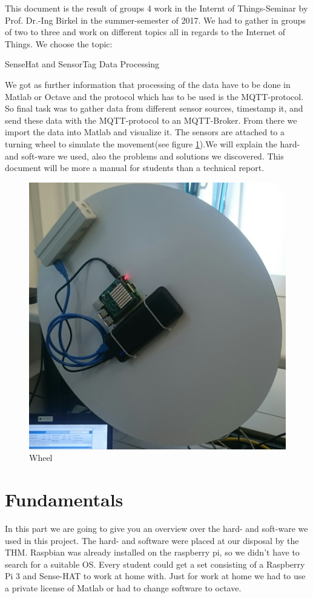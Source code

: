 \documentclass[12pt]{article}
\begin{document}
This document is the result of groups 4 work in the Internt of Things-Seminar by Prof. Dr.-Ing Birkel in the summer-semester of 2017. We had to gather in groups of two to three and work on different topics all in regards to the Internet of Things. We choose the topic:
\begin{center}
	
	SenseHat and SensorTag Data Processing
	
\end{center}
We got as further information that processing of the data have to be done in Matlab or Octave and the protocol which has to be used is the MQTT-protocol. So final task was to gather data from different sensor sources, timestamp it, and send these data with the MQTT-protocol to an MQTT-Broker. From there we import the data into Matlab and visualize it. The sensors are attached to a turning wheel to simulate the movement(see figure \ref{fig:realwheel.jpg}).We will explain the hard- and soft-ware we used, also the problems and solutions we discovered. 
This document will be more a manual for students than a technical report.  
\begin{figure}[H]
\includegraphics[width=0.5\linewidth]{realwheel.jpg}
\centering
\caption{Wheel}
\label{fig:realwheel.jpg}
\end{figure}
\newpage 
\section{Fundamentals}
In this part we are going to give you an overview over the hard- and soft-ware we used in this project. The hard- and software were placed at our disposal by the THM. Raspbian was already  installed on the raspberry pi, so we didn't have to search for a suitable OS. Every student could get a set consisting of a Raspberry Pi 3 and Sense-HAT to work at home with. Just for work at home we had to use a private license of Matlab or had to change software to octave. 
\end{document}

